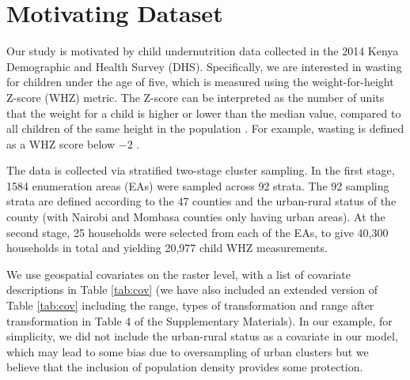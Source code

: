 \documentclass[preprint,12pt,authoryear]{elsarticle}
\begin{document}
\section{Motivating Dataset}
\label{sec:mot}

Our study is motivated by child undernutrition data collected in the 2014 Kenya Demographic and Health Survey (DHS). Specifically, we are interested in wasting for children under the age of five, which is measured using the weight-for-height Z-score (WHZ) metric. The Z-score can be interpreted as the number of units that the weight for a child is higher or lower than the median value, compared to all children of the same height in the population \citep{mei2007standard}. For example, wasting is defined as a WHZ score below $-2$ \citep{kassie2019exploring}. 

The data is collected via stratified two-stage cluster sampling. In the first stage, 1584 enumeration areas (EAs) were sampled across 92 strata. The 92 sampling strata are defined according to the 47 counties and the urban-rural status of the county (with Nairobi and Mombasa counties only having urban areas). At the second stage, 25 households were selected from each of the EAs, to give 40,300 households in total and yielding 20,977 child WHZ measurements. 

We use geospatial covariates on the raster level, with a list of covariate descriptions in Table \ref{tab:cov} {(we have also included an extended version of Table \ref{tab:cov} including the range, types of transformation and range after transformation in Table 4 of the Supplementary Materials)}. In our example, for simplicity, we did not include the urban-rural status as a covariate in our model, which may lead to some bias due to oversampling of urban clusters but we believe that the inclusion of population density provides some protection.
\end{document}
